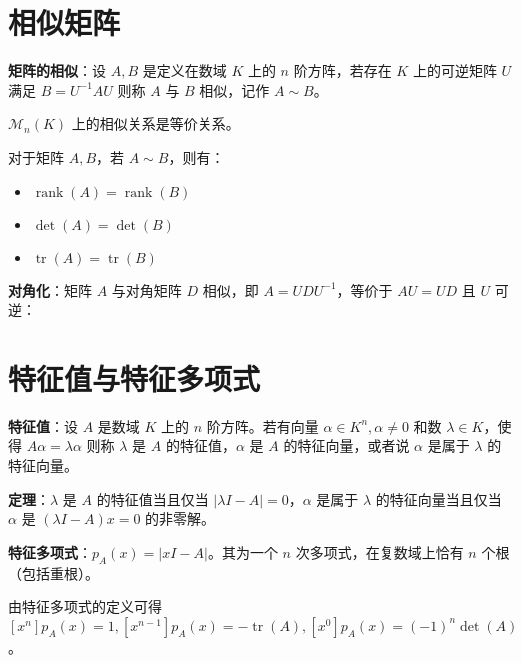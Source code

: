 \section{相似矩阵}

\begin{tcolorbox}
\textbf{矩阵的相似}：设 $A,B$ 是定义在数域 $K$ 上的 $n$ 阶方阵，若存在 $K$ 上的可逆矩阵 $U$ 满足 $B=U^{-1}AU$ 
			则称 $A$ 与 $B$ 相似，记作 $A\sim B$。
\end{tcolorbox}

$\mathcal{M}_n(K)$ 上的相似关系是等价关系。

对于矩阵 $A,B$，若 $A\sim B$，则有：

\begin{itemize}
	\item $\operatorname{rank}(A)=\operatorname{rank}(B)$
	\item $\det(A)=\det(B)$
	\item $\operatorname{tr}(A)=\operatorname{tr}(B)$
\end{itemize}

\begin{tcolorbox}
\textbf{对角化}：矩阵 $A$ 与对角矩阵 $D$ 相似，即 $A=UDU^{-1}$，等价于 $AU=UD$ 且 $U$ 可逆：
\end{tcolorbox}

\section{特征值与特征多项式}

\begin{tcolorbox}
\textbf{特征值}：设 $A$ 是数域 $K$ 上的 $n$ 阶方阵。若有向量 $\alpha \in K^n,\alpha\ne 0$ 和数 $\lambda\in K$，使得 $A\alpha=\lambda\alpha$ 则称 $\lambda$ 是 $A$ 的特征值，$\alpha$ 是 $A$ 的特征向量，或者说 $\alpha$ 是属于 $\lambda$ 的特征向量。
\end{tcolorbox}

\begin{tcolorbox}
\textbf{定理}：$\lambda$ 是 $A$ 的特征值当且仅当 $|\lambda I-A|=0$，$\alpha$ 是属于 $\lambda$ 的特征向量当且仅当 $\alpha$ 是 $(\lambda I-A)x=0$ 的非零解。
\end{tcolorbox}

\begin{tcolorbox}
\textbf{特征多项式}：$p_A(x)=|xI-A|$。其为一个 $n$ 次多项式，在复数域上恰有 $n$ 个根（包括重根）。
\end{tcolorbox}

由特征多项式的定义可得 $[x^n]p_A(x)=1,[x^{n-1}]p_A(x)=-\operatorname{tr}(A),[x^0]p_A(x)=(-1)^n\det(A)$。

